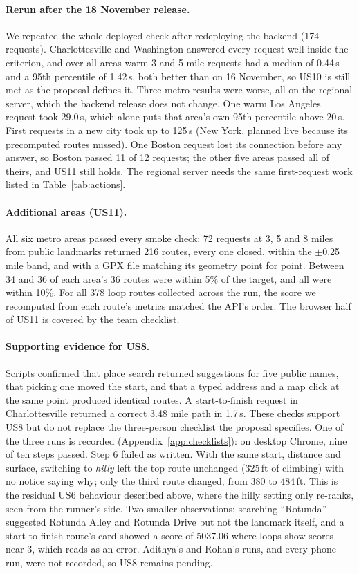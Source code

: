 \paragraph{Rerun after the 18 November release.}
We repeated the whole deployed check after redeploying the backend (174
requests). Charlottesville and Washington answered every request well inside
the criterion, and over all areas warm 3 and 5 mile requests had a median of
0.44\,s and a 95th percentile of 1.42\,s, both better than on 16 November, so
US10 is still met as the proposal defines it. Three metro results were worse,
all on the regional server, which the backend release does not change. One
warm Los Angeles request took 29.0\,s, which alone puts that area's own 95th
percentile above 20\,s. First requests in a new city took up to 125\,s (New
York, planned live because its precomputed routes missed). One Boston request
lost its connection before any answer, so Boston passed 11 of 12 requests;
the other five areas passed all of theirs, and US11 still holds. The regional
server needs the same first-request work listed in Table~\ref{tab:actions}.

\paragraph{Additional areas (US11).}
All six metro areas passed every smoke check: 72 requests at 3, 5 and 8 miles
from public landmarks returned 216 routes, every one closed, within the
$\pm$0.25 mile band, and with a GPX file matching its geometry point for
point. Between 34 and 36 of each area's 36 routes were within 5\% of the
target, and all were within 10\%. For all 378 loop routes collected across
the run, the score we recomputed from each route's metrics matched the API's
order. The browser half of US11 is covered by the team checklist.

\paragraph{Supporting evidence for US8.}
Scripts confirmed that place search returned suggestions for five public
names, that picking one moved the start, and that a typed address and a map
click at the same point produced identical routes. A start-to-finish request
in Charlottesville returned a correct 3.48 mile path in 1.7\,s. These checks
support US8 but do not replace the three-person checklist the proposal
specifies. One of the three runs is recorded (Appendix~\ref{app:checklists}):
on desktop Chrome, nine of ten steps passed. Step 6 failed as written. With
the same start, distance and surface, switching to \emph{hilly} left the top
route unchanged (325\,ft of climbing) with no notice saying why; only the
third route changed, from 380 to 484\,ft. This is the residual US6 behaviour
described above, where the hilly setting only re-ranks, seen from the
runner's side. Two smaller observations: searching ``Rotunda'' suggested
Rotunda Alley and Rotunda Drive but not the landmark itself, and a
start-to-finish route's card showed a score of 5037.06 where loops show
scores near 3, which reads as an error. Adithya's and Rohan's runs, and every
phone run, were not recorded, so US8 remains pending.

